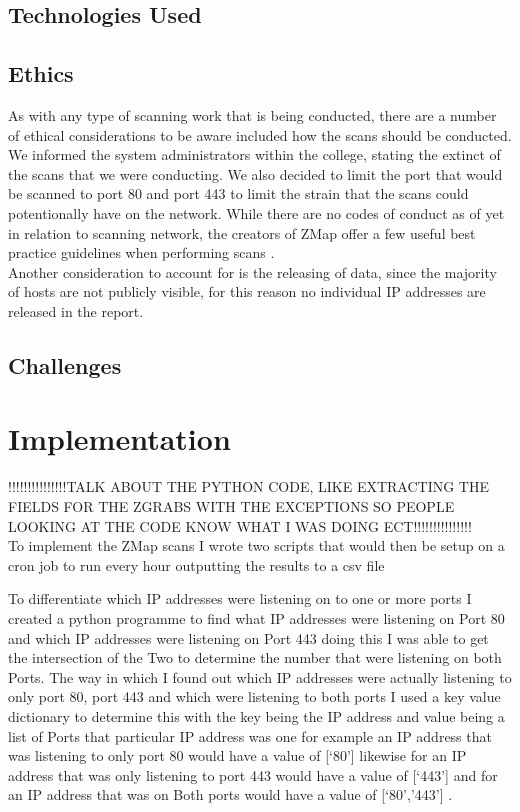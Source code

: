 \documentclass[a4wide,leqno,12pt]{report}
\begin{document}
\section{Technologies Used}
\section{Ethics}


As with any type of scanning work that is being conducted, there are a number of ethical considerations to be aware included how the scans should be conducted. We informed the system administrators within the college, stating the extinct of the scans that we were conducting. We also decided to limit the port that would be scanned to port 80 and port 443 to limit the strain that the scans could potentionally have on the network. While there are no codes of conduct as of yet in relation to scanning network, the creators of ZMap offer a few useful best practice guidelines when performing scans\cite{durumeric2015search}  \cite{durumeric2013zmap}.\\

Another consideration to account for is the releasing of data, since the majority of hosts are not publicly visible, for this reason no individual IP addresses are released in the report.
\section{Challenges}
\chapter{Implementation}

!!!!!!!!!!!!!!!TALK ABOUT THE PYTHON CODE, LIKE EXTRACTING THE FIELDS FOR THE ZGRABS WITH THE EXCEPTIONS SO PEOPLE LOOKING AT THE CODE KNOW WHAT I WAS DOING ECT!!!!!!!!!!!!!!!\\


To implement the ZMap scans I wrote two scripts that would then be setup on a cron job to run every hour outputting the results to a csv file

To differentiate which IP addresses were listening on to one or more ports I created a python programme to find what IP addresses were listening on Port 80 and which IP addresses were listening on Port 443 doing this I was able to get the intersection of the Two to determine the number that were listening on both Ports. The way in which I found out which IP addresses were actually listening to only port 80, port 443 and which were listening to both ports I used a key value dictionary to determine this with the key being the IP address and value being a list of Ports that particular IP address was one for example an IP address that was listening to only port 80 would have a value of [‘80’] likewise for an IP address that was only listening to port 443 would have a value of [‘443’] and for an IP address that was on Both ports would have a value of [‘80’,’443’] .
\end{document}
